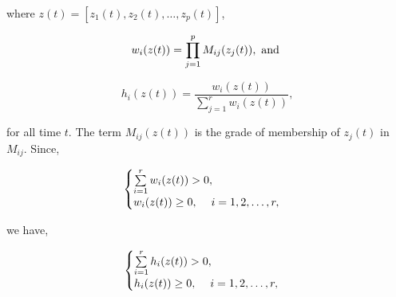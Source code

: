 where $z(t) = \left[z_1(t), z_2(t), \dots, z_p(t)\right]$, 

\begin{equation}
  w_i(z(t)) = \prod\limits_{j=1}^{p} M_{ij}(z_j(t)), \ \mathrm{and}\ 
\end{equation}

\begin{equation}
  h_i(z(t)) =  \frac{w_i(z(t))}{\sum\limits_{j=1}^{r} w_{i}(z(t))},
\end{equation}

for all time $t$. The term $M_{ij}(z(t))$ is the grade of membership of $z_j(t)$ in $M_{ij}$. Since,

\begin{equation}
  \begin{cases}
    \sum\limits_{i=1}^{r} w_i(z(t)) > 0, \\
    w_i(z(t)) \geq 0, \hspace*{12pt} i=1, 2, \dots, r,
  \end{cases}
\end{equation}

we have,

\begin{equation}
  \begin{cases}
    \sum\limits_{i=1}^{r} h_i(z(t)) > 0, \\
    h_i(z(t)) \geq 0, \hspace*{12pt} i=1, 2, \dots, r,
  \end{cases}
\end{equation}